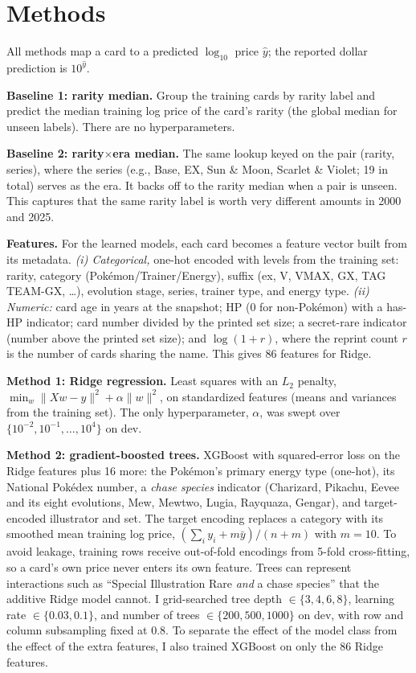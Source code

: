 \documentclass{article}
\begin{document}
\section{Methods}

All methods map a card to a predicted $\log_{10}$ price $\hat{y}$; the reported dollar prediction is $10^{\hat{y}}$.

\textbf{Baseline 1: rarity median.} Group the training cards by rarity label and predict the median training log price of the card's rarity (the global median for unseen labels). There are no hyperparameters.

\textbf{Baseline 2: rarity$\times$era median.} The same lookup keyed on the pair (rarity, series), where the series (e.g., Base, EX, Sun \& Moon, Scarlet \& Violet; 19 in total) serves as the era. It backs off to the rarity median when a pair is unseen. This captures that the same rarity label is worth very different amounts in 2000 and 2025.

\textbf{Features.} For the learned models, each card becomes a feature vector built from its metadata.
\emph{(i) Categorical,} one-hot encoded with levels from the training set: rarity, category (Pok\'emon/Trainer/Energy), suffix (ex, V, VMAX, GX, TAG TEAM-GX, \ldots), evolution stage, series, trainer type, and energy type.
\emph{(ii) Numeric:} card age in years at the snapshot; HP (0 for non-Pok\'emon) with a has-HP indicator; card number divided by the printed set size; a secret-rare indicator (number above the printed set size); and $\log(1+r)$, where the reprint count $r$ is the number of cards sharing the name.
This gives 86 features for Ridge.

\textbf{Method 1: Ridge regression.} Least squares with an $L_2$ penalty, $\min_w \|Xw - y\|^2 + \alpha\|w\|^2$, on standardized features (means and variances from the training set). The only hyperparameter, $\alpha$, was swept over $\{10^{-2}, 10^{-1}, \ldots, 10^{4}\}$ on dev.

\textbf{Method 2: gradient-boosted trees.} XGBoost \citep{chen2016xgboost} with squared-error loss on the Ridge features plus 16 more: the Pok\'emon's primary energy type (one-hot), its National Pok\'edex number, a \emph{chase species} indicator (Charizard, Pikachu, Eevee and its eight evolutions, Mew, Mewtwo, Lugia, Rayquaza, Gengar), and target-encoded illustrator and set. The target encoding replaces a category with its smoothed mean training log price, $(\sum_i y_i + m\bar{y})/(n + m)$ with $m=10$. To avoid leakage, training rows receive out-of-fold encodings from 5-fold cross-fitting, so a card's own price never enters its own feature. Trees can represent interactions such as ``Special Illustration Rare \emph{and} a chase species'' that the additive Ridge model cannot. I grid-searched tree depth $\in\{3,4,6,8\}$, learning rate $\in\{0.03, 0.1\}$, and number of trees $\in\{200, 500, 1000\}$ on dev, with row and column subsampling fixed at 0.8. To separate the effect of the model class from the effect of the extra features, I also trained XGBoost on only the 86 Ridge features.
\end{document}
